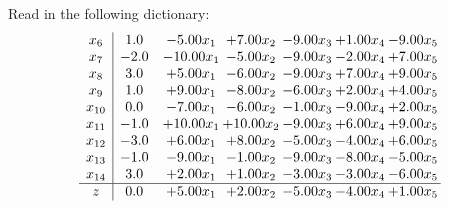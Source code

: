 \documentclass[9pt]{article}
\begin{document}
Read in the following dictionary:
\[\begin{array}{c| c c@{\hskip 2pt} c@{\hskip 2pt} c@{\hskip 2pt} c@{\hskip 2pt} c@{\hskip 2pt} }
 x_{6}   &  1.0 & -5.00 x_{1} & +  7.00 x_{2} & -9.00 x_{3} & +  1.00 x_{4} & -9.00 x_{5}\\
 x_{7}   &  -2.0 & -10.00 x_{1} & -5.00 x_{2} & -9.00 x_{3} & -2.00 x_{4} & +  7.00 x_{5}\\
 x_{8}   &  3.0 & +  5.00 x_{1} & -6.00 x_{2} & -9.00 x_{3} & +  7.00 x_{4} & +  9.00 x_{5}\\
 x_{9}   &  1.0 & +  9.00 x_{1} & -8.00 x_{2} & -6.00 x_{3} & +  2.00 x_{4} & +  4.00 x_{5}\\
 x_{10}   &  0.0 & -7.00 x_{1} & -6.00 x_{2} & -1.00 x_{3} & -9.00 x_{4} & +  2.00 x_{5}\\
 x_{11}   &  -1.0 & + 10.00 x_{1} & + 10.00 x_{2} & -9.00 x_{3} & +  6.00 x_{4} & +  9.00 x_{5}\\
 x_{12}   &  -3.0 & +  6.00 x_{1} & +  8.00 x_{2} & -5.00 x_{3} & -4.00 x_{4} & +  6.00 x_{5}\\
 x_{13}   &  -1.0 & -9.00 x_{1} & -1.00 x_{2} & -9.00 x_{3} & -8.00 x_{4} & -5.00 x_{5}\\
 x_{14}   &  3.0 & +  2.00 x_{1} & +  1.00 x_{2} & -3.00 x_{3} & -3.00 x_{4} & -6.00 x_{5}\\
\hline
z    &  0.0 & +  5.00 x_{1} & +  2.00 x_{2} & -5.00 x_{3} & -4.00 x_{4} & +  1.00 x_{5}\\
\end{array}\]
\end{document}
